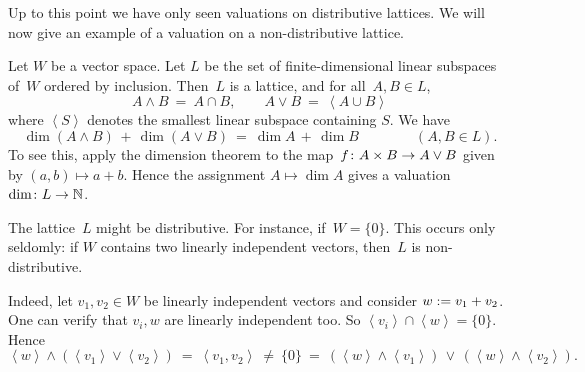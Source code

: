\documentclass[main.tex]{subfiles}
\begin{document}
\begin{ex}
Up to this point
we have only seen valuations on distributive lattices.
We will now give an example
of a valuation on a non-distributive lattice.

Let $W$ be a vector space.
Let $L$ be the set of finite-dimensional linear subspaces
of~$W$ ordered by inclusion.
  Then~$L$ is a lattice, and 
for all~$A,B\in L$,
\begin{equation*}
A\wedge B \ =\ A\cap B,
\qquad A\vee B \ =\ \left<A\cup B\right>
\end{equation*}
where $\left< S \right>$ denotes the smallest
linear subspace containing $S$.
We have
\begin{equation*}
\dim (A\wedge B) \,+\, \dim(A\vee B)
\ =\ 
\dim A \,+\, \dim B 
\qquad\qquad(A,B\in L).
\end{equation*}
To see this,
apply the dimension theorem
to the map~$f\colon A\times B\rightarrow A\vee B$ given by  $(a,b)\mapsto a+b$.
Hence the assignment $A \mapsto \dim A$
gives a valuation $\dim\colon L\rightarrow \mathbb{N}$.

The lattice~$L$ might be distributive.
For instance, if~$W=\{ 0 \}$.
This occurs only seldomly:
if $W$ contains two linearly independent vectors,
then~$L$ is non-distributive.

Indeed,
let $v_1,v_2\in W$ be linearly independent vectors
and consider  $w:= v_1 + v_2$.
One can verify that $v_i, w$ are linearly independent too.
So $\left< v_i \right> \cap \left< w \right> = \{0\}$.
Hence
\begin{equation*}
\left< w \right> \wedge(\left< v_1 \right>\vee\left< v_2 \right>)
\ =\ 
\left< v_1, v_2 \right>
\ \neq\ 
\{0\}
\ =\ 
(\left<w\right> \wedge \left<v_1\right>)
\,\vee\, (\left<w\right> \wedge \left<v_2\right>).
\end{equation*}
\end{ex}

%
%
%
%
\end{document}
